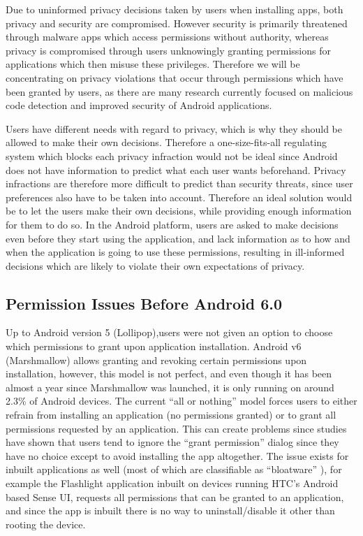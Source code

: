Due to uninformed privacy decisions taken by users when installing apps, both privacy and security are compromised. However security is primarily threatened through malware apps which access permissions without authority, whereas privacy is compromised through users unknowingly granting permissions for applications which then misuse these privileges. Therefore we will be concentrating on privacy violations that occur through permissions which have been granted by users, as there are many research currently focused on malicious code detection and improved security of Android applications.
\smallskip

Users have different needs with regard to privacy, which is why they should be allowed to make their own decisions. Therefore a one-size-fits-all regulating system which blocks each privacy infraction would not be ideal since Android does not have information to predict what each user wants beforehand. Privacy infractions are therefore more difficult to predict than security threats, since user preferences also have to be taken into account. Therefore an ideal solution would be to let the users make their own decisions, while providing enough information for them to do so. In the Android platform, users are asked to make decisions even before they start using the application, and lack information as to how and when the application is going to use these permissions, resulting in ill-informed decisions which are likely to violate their own expectations of privacy. 


\subsection{Permission Issues Before Android 6.0}
Up to Android version 5 (Lollipop),users were not given an option to choose which permissions to grant upon application installation. Android v6 (Marshmallow) allows granting and revoking certain permissions upon installation, however, this model is not perfect, and even though it has been almost a year since Marshmallow was launched, it is only running on around 2.3\% of Android devices. \cite{k} The current “all or nothing” model forces users to either refrain from installing an application (no permissions granted) or to grant all permissions requested by an application. This can create problems since studies have shown that users tend to ignore the “grant permission” dialog since they have no choice except to avoid installing the app altogether. \cite{wijesekera2015android} The issue exists for inbuilt applications as well (most of which are classifiable as “bloatware” \cite{mcdaniel2012bloatware} ), for example the Flashlight application inbuilt on devices running HTC’s Android based Sense UI, requests all permissions that can be granted to an application, and since the app is inbuilt there is no way to uninstall/disable it other than rooting the device. 

